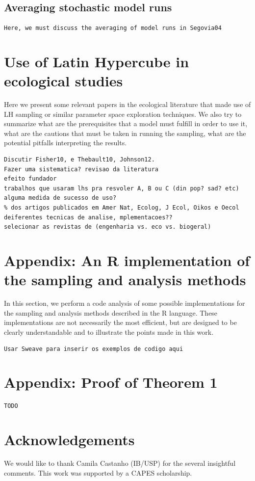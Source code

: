 \subsection{Averaging stochastic model runs}
\begin{verbatim}
Here, we must discuss the averaging of model runs in Segovia04
\end{verbatim}
\section{Use of Latin Hypercube in ecological studies}\label{Studies}
Here we present some relevant papers in the ecological literature that made 
use of LH sampling or similar parameter space exploration techniques. We also 
try to summarize what are the prerequisites that a model must fulfill in 
order to use it, 
what are the cautions that must be taken in running the sampling, what are 
the potential pitfalls interpreting the results.

\begin{verbatim}
Discutir Fisher10, e Thebault10, Johnson12.
Fazer uma sistematica? revisao da literatura
efeito fundador
trabalhos que usaram lhs pra resvoler A, B ou C (din pop? sad? etc)
alguma medida de sucesso de uso?
% dos artigos publicados em Amer Nat, Ecolog, J Ecol, Oikos e Oecol
deiferentes tecnicas de analise, mplementacoes??
selecionar as revistas de (engenharia vs. eco vs. biogeral)
\end{verbatim}

\section{Appendix: An R implementation of the sampling and analysis methods}
In this section, we perform a code analysis of some possible implementations
for the sampling and analysis methods described in the R language. These
implementations are not necessarily the most efficient, but are designed
to be clearly understandable and to illustrate the points made in this work.
\begin{verbatim}
Usar Sweave para inserir os exemplos de codigo aqui
\end{verbatim}

\section{Appendix: Proof of Theorem 1}

\begin{verbatim}
TODO
\end{verbatim}

\section*{Acknowledgements}
We would like to thank Camila Castanho (IB/USP) for the several insightful comments.
This work was supported by a CAPES scholarship.
